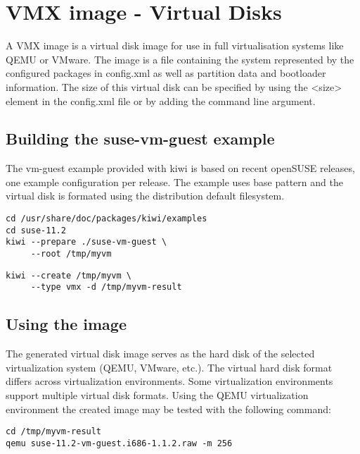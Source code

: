 \chapter{VMX image - Virtual Disks}
\label{chapter:vmx}
\minitoc

A VMX image is a virtual disk image for use in full virtualisation
systems like QEMU or VMware. The image is a file containing the
system represented by the configured packages in config.xml as well
as partition data and bootloader information. The size of
this virtual disk can be specified by using the <size> element
in the config.xml file or by adding the  command
line argument.

\section{Building the suse-vm-guest example}

The vm-guest example provided with kiwi is based on recent openSUSE releases,
one example configuration per release. The example uses base pattern and the
virtual disk is formated using the distribution default filesystem.

\begin{Command}{12cm}
\begin{verbatim}
cd /usr/share/doc/packages/kiwi/examples
cd suse-11.2
kiwi --prepare ./suse-vm-guest \
     --root /tmp/myvm
\end{verbatim}
\end{Command}

\begin{Command}{12cm}
\begin{verbatim}
kiwi --create /tmp/myvm \
     --type vmx -d /tmp/myvm-result
\end{verbatim}
\end{Command}

\section{Using the image}

The generated virtual disk image serves as the hard disk of the selected
virtualization system (QEMU, VMware, etc.). The virtual hard disk format 
differs across virtualization environments. Some virtualization environments
support multiple virtual disk formats. Using the QEMU virtualization 
environment the created image may be tested with the following command:

\begin{Command}{12cm}
\begin{verbatim}
cd /tmp/myvm-result
qemu suse-11.2-vm-guest.i686-1.1.2.raw -m 256
\end{verbatim}
\end{Command}

